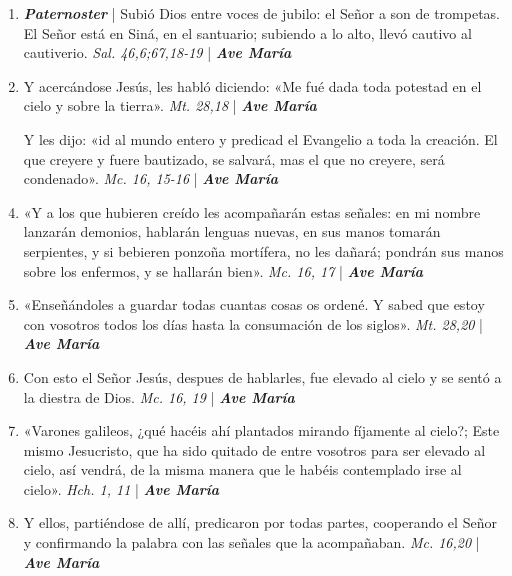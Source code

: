 \documentclass[../../devocionario.tex]{subfiles}
\begin{document}
    \begin{enumerate}
    
        \item \textbf{\textit{Paternoster}} | Subió Dios entre voces de jubilo: el Señor a son de trompetas. 
            El Señor está en Siná, en el santuario; subiendo a lo alto, llevó cautivo al cautiverio. \textit{Sal. 46,6;67,18-19} | \textbf{\textit{Ave María}}

        \item Y acercándose Jesús, les habló diciendo: «Me fué dada toda potestad en el cielo y sobre la tierra». \textit{Mt. 28,18} | \textbf{\textit{Ave María}}

        \item [Y les dijo:] «id al mundo entero y predicad el Evangelio a toda la creación. El que creyere y fuere bautizado, 
            se salvará, mas el que no creyere, será condenado». \textit{Mc. 16, 15-16} | \textbf{\textit{Ave María}}

        \item «Y a los que hubieren creído les acompañarán estas señales: en mi nombre lanzarán demonios, 
            hablarán lenguas nuevas, en sus manos tomarán serpientes, y si bebieren ponzoña mortífera, 
            no les dañará; pondrán sus manos sobre los enfermos, y se hallarán bien». \textit{Mc. 16, 17} | \textbf{\textit{Ave María}}

        \item «Enseñándoles a guardar todas cuantas cosas os ordené. Y sabed que estoy con vosotros todos 
            los días hasta la consumación de los siglos». \textit{Mt. 28,20} | \textbf{\textit{Ave María}}

        \item Con esto el Señor Jesús, despues de hablarles, fue elevado al cielo y 
            se sentó a la diestra de Dios. \textit{Mc. 16, 19} | \textbf{\textit{Ave María}}

        \item «Varones galileos, ¿qué hacéis ahí plantados mirando fíjamente al cielo?; Este mismo Jesucristo, 
            que ha sido quitado de entre vosotros para ser elevado al cielo, así vendrá, 
            de la misma manera que le habéis contemplado irse al cielo». \textit{Hch. 1, 11} | \textbf{\textit{Ave María}}

        \item Y ellos, partiéndose de allí, predicaron por todas partes, cooperando el Señor y 
            confirmando la palabra con las señales que la acompañaban. \textit{Mc. 16,20} | \textbf{\textit{Ave María}}


\end{enumerate}
\end{document}
